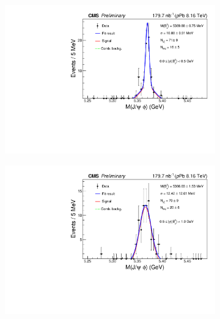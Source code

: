 \begin{figure}[htp!]
	\centering
	\centering
	\begin{subfigure}[b]{0.475\textwidth}
		\centering
		\includegraphics[width=\textwidth]{MainContent/Figs/mass/mass_BsFit_ybins_syssig_0.0_0.5.PDF}
		\caption{}%
	\end{subfigure}
	\hfill
	\begin{subfigure}[b]{0.475\textwidth}
		\centering
		\includegraphics[width=\textwidth]{MainContent/Figs/mass/mass_BsFit_ybins_syssig_0.5_1.0.PDF}
		\caption{}%
		

\end{subfigure}
\end{figure}
